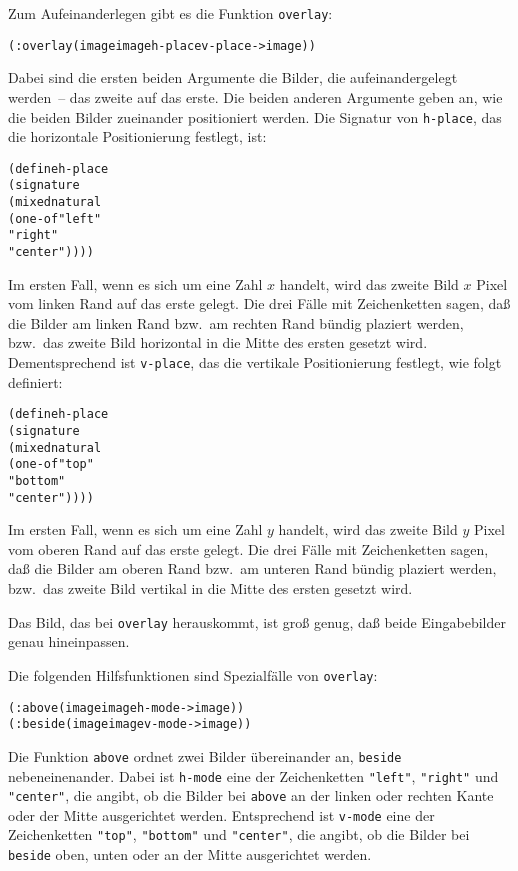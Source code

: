 Zum Aufeinanderlegen gibt es die Funktion \texttt{overlay}:
%
\begin{alltt}
(: overlay (image image h-place v-place -> image))
\end{alltt}
%
Dabei sind die ersten beiden Argumente die Bilder, die
aufeinandergelegt werden~-- das zweite auf das erste.
Die beiden anderen Argumente geben an, wie
die beiden Bilder zueinander positioniert werden.  Die Signatur
von \texttt{h-place}, das die horizontale Positionierung festlegt,
ist:
%
\begin{alltt}
(define h-place
   (signature
      (mixed natural
             (one-of "left"
                     "right"
                     "center"))))
\end{alltt}
%
Im ersten Fall, wenn es sich um eine Zahl $x$ handelt, wird das zweite
Bild $x$ Pixel vom linken Rand auf das erste gelegt.  Die drei
Fälle mit Zeichenketten sagen, daß die Bilder am linken Rand bzw.\ am
rechten Rand bündig plaziert werden, bzw.\ das zweite Bild horizontal
in die Mitte des ersten gesetzt wird.
Dementsprechend ist
\texttt{v-place}, das die vertikale Positionierung festlegt,
wie folgt definiert:
%
\begin{alltt}
(define h-place
   (signature
      (mixed natural
             (one-of "top"
                     "bottom"
                     "center"))))
\end{alltt}
%
Im ersten Fall, wenn es sich um eine Zahl $y$ handelt, wird das zweite
Bild $y$ Pixel vom oberen Rand auf das erste gelegt.  Die drei
Fälle mit Zeichenketten sagen, daß die Bilder am oberen Rand bzw.\ am
unteren Rand bündig plaziert werden, bzw.\ das zweite Bild vertikal
in die Mitte des ersten gesetzt wird.

Das Bild, das bei \texttt{overlay} herauskommt, ist groß genug, daß
beide Eingabebilder genau hineinpassen.

Die folgenden Hilfsfunktionen sind Spezialfälle von \texttt{overlay}:
%
\begin{alltt}
(: above  (image image h-mode -> image))
(: beside (image image v-mode -> image))
\end{alltt}
%
Die Funktion \texttt{above} ordnet zwei
Bilder übereinander an, \texttt{beside}
nebeneinenander.  Dabei ist \texttt{h-mode} eine der Zeichenketten
\verb|"left"|, \verb|"right"| und \verb|"center"|, die angibt, ob die
Bilder bei \texttt{above} an der linken oder rechten Kante oder der
Mitte ausgerichtet werden.  Entsprechend ist \texttt{v-mode} eine der
Zeichenketten \verb|"top"|, \verb|"bottom"| und \verb|"center"|, die
angibt, ob die Bilder bei \texttt{beside} oben, unten oder an der
Mitte ausgerichtet werden.

